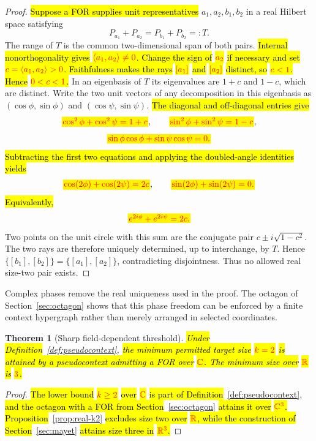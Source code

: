 \documentclass[
  twocolumn,
  aps,
  pra,
  floatfix,
  amsmath,amssymb,
  longbibliography
]{revtex4-2}
\newtheorem{theorem}{Theorem}
\theoremstyle{definition}
\theoremstyle{remark}
\newcommand{\R}{\mathbb R}
\newcommand{\C}{\mathbb C}
\newcommand{\corr}[1]{{\color{red}\hl{#1}}}
\newcommand{\corrmath}[1]{\begingroup\setlength{\fboxsep}{1pt}\colorbox{yellow}{\ensuremath{\color{red}#1}}\endgroup}
\begin{document}
\begin{proof}
\corr{Suppose a FOR supplies unit representatives}
$a_1,a_2,b_1,b_2$ in a real Hilbert space satisfying
\[
 P_{a_1}+P_{a_2}=P_{b_1}+P_{b_2}=:T.
\]
The range of $T$ is the common two-dimensional span of both pairs.
\corr{Internal nonorthogonality gives}
\corrmath{\langle a_1,a_2\rangle\ne0}\corr{.  Change the sign of}
\corrmath{a_2} \corr{if necessary and set}
\corrmath{c=\langle a_1,a_2\rangle>0}\corr{.  Faithfulness makes the rays}
\corrmath{[a_1]} \corr{and} \corrmath{[a_2]} \corr{distinct, so}
\corrmath{c<1}\corr{.  Hence} \corrmath{0<c<1}\corr{.}
In an eigenbasis of $T$ its eigenvalues are
$1+c$ and $1-c$, which are distinct.  Write the two unit vectors of any
decomposition in this eigenbasis as
$(\cos\phi,\sin\phi)$ and $(\cos\psi,\sin\psi)$.  \corr{The diagonal and
off-diagonal entries give}
\[
 \corrmath{\cos^2\phi+\cos^2\psi=1+c},\qquad
 \corrmath{\sin^2\phi+\sin^2\psi=1-c},
\]
\[
 \corrmath{\sin\phi\cos\phi+\sin\psi\cos\psi=0.}
\]
\corr{Subtracting the first two equations and applying the doubled-angle
identities yields}
\[
 \corrmath{\cos(2\phi)+\cos(2\psi)=2c},\qquad
 \corrmath{\sin(2\phi)+\sin(2\psi)=0.}
\]
\corr{Equivalently,}
\[
 \corrmath{e^{2i\phi}+e^{2i\psi}=2c.}
\]
Two points on the unit circle with this sum are
the conjugate pair $c\pm i\sqrt{1-c^2}$.  The two rays are therefore uniquely
determined, up to interchange, by $T$.  Hence
$\{[b_1],[b_2]\}=\{[a_1],[a_2]\}$, contradicting disjointness.
Thus no allowed real size-two pair exists.
\end{proof}

Complex phases remove the real uniqueness used in the proof.  The octagon of
Section~\ref{sec:octagon} shows that this phase freedom can be enforced by a
finite context hypergraph rather than merely arranged in selected
coordinates.

\begin{theorem}[Sharp field-dependent threshold]
\label{thm:threshold}
\corr{Under Definition}~\ref{def:pseudocontext}, \corr{the minimum permitted
target size} \corrmath{k=2} \corr{is attained by a pseudocontext admitting a FOR
over} \corrmath{\C}\corr{.  The minimum size over} \corrmath{\R} \corr{is}
\corrmath{3}\corr{.}
\end{theorem}

\begin{proof}
\corr{The lower bound} \corrmath{k\ge2} \corr{over} \corrmath{\C}
\corr{is part of Definition}~\ref{def:pseudocontext}, \corr{and the octagon
with a FOR from Section}~\ref{sec:octagon} \corr{attains it over}
\corrmath{\C^3}\corr{.
Proposition}~\ref{prop:real-k2} \corr{excludes size two over} \corrmath{\R}\corr{,
while the construction of Section}~\ref{sec:mayet} \corr{attains size three in}
\corrmath{\R^3}\corr{.}
\end{proof}
\end{document}
